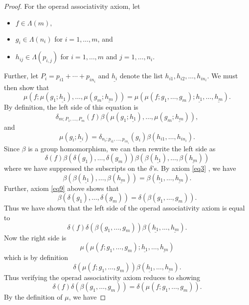 \documentclass{amsbook} %
\newenvironment{eqn}{\begin{equation}}{\end{equation}}
\numberwithin{section}{chapter}
\begin{document}
\begin{proof}
For the operad associativity axiom, let
\begin{itemize}
\item $f \in \Lambda(m),$
\item $g_{i} \in \Lambda(n_{i})$ for $i=1, \ldots, m$, and
\item $h_{ij} \in \Lambda(p_{i,j})$ for $i=1, \ldots, m$ and $j=1, \ldots, n_{i}$.
\end{itemize}
Further, let $P_{i} = p_{i1} + \cdots + p_{in_{i}}$ and $\underline{h_i}$ denote the list $h_{i1}, h_{i2}, \ldots, h_{in_{i}}$.  We must then show that
  \[
    \mu\left( f; \mu\left(g_{1}; \underline{h_1}\right), \ldots, \mu\left(g_{m}; \underline{h_m}\right) \right) = \mu\left( \mu\left(f; g_{1}, \ldots, g_{m}\right); \underline{h_1}, \ldots, \underline{h_m} \right).
  \]
By definition, the left side of this equation is
  \[
    \delta_{m; P_{1}, \ldots, P_{m}}(f) \beta\left( \mu\left(g_{1}; \underline{h_1}\right), \ldots, \mu\left(g_{m}; \underline{h_m}\right) \right),
  \]
and
  \[
    \mu\left(g_{i}; \underline{h_i}\right) = \delta_{n_{i}; p_{i1}, \ldots, p_{in_{i}}}(g_{i})\beta\left(h_{i1}, \ldots, h_{in_{i}}\right).
  \]
Since $\beta$ is a group homomorphism, we can then rewrite the left side as
  \[
    \delta(f)\beta\left(\delta(g_{1}), \ldots, \delta(g_{m})\right)\beta\left(\beta\left(\underline{h_1}\right), \ldots, \beta\left(\underline{h_m}\right)\right)
  \]
where we have suppressed the subscripts on the $\delta$'s.  By axiom \eqref{eq3} , we have
  \[
    \beta\left(\beta\left(\underline{h_1}\right), \ldots, \beta\left(\underline{h_m}\right)\right) = \beta\left(\underline{h_1},\ldots,\underline{h_m}\right).
  \]
Further, axiom \eqref{eq9} above shows that
  \[
    \beta\left(\delta(g_{1}), \ldots, \delta\left(g_{m}\right)\right) = \delta\left(\beta\left(g_{1}, \ldots, g_{m}\right)\right).
  \]
Thus we have shown that the left side of the operad associativity axiom is equal to
  \[
    \delta(f)\delta\left(\beta(g_{1}, \ldots, g_{m})\right)\beta\left(\underline{h_1},\ldots,\underline{h_m}\right).
  \]
Now the right side is
  \[
    \mu\left( \mu (f; g_{1}, \ldots, g_{m}); \underline{h_1}, \ldots, \underline{h_m} \right)
  \]
which is by definition
  \[
    \delta\left(\mu (f; g_{1}, \ldots, g_{m})\right)\beta\left(\underline{h_1}, \ldots, \underline{h_m}\right).
  \]
Thus verifying the operad associativity axiom reduces to showing
\begin{eqn}\label{eqn:opass}
\delta(f)\delta\left(\beta(g_{1}, \ldots, g_{m})\right) = \delta\left(\mu (f; g_{1}, \ldots, g_{m})\right).
\end{eqn}By the definition of $\mu$, we have

\end{proof}
\end{document}
